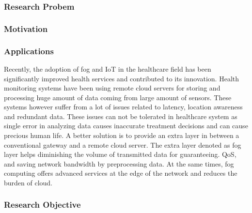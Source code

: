 \documentclass[10pt]{llncs}
\begin{document}
%
\subsubsection{Research Probem}


%
\subsubsection{Motivation}


%

%

%

%
\subsubsection{Applications}
Recently, the adoption of fog and IoT in the healthcare field has been significantly improved health services and contributed to its innovation. Health monitoring systems have been using remote cloud servers for storing and processing huge amount of data coming from large amount of sensors. These systems however suffer from a lot of issues related to latency, location awareness and redundant data. These issues can not be tolerated in healthcare system as single error in analyzing data causes inaccurate treatment decisions and can cause precious human life. A better solution is to provide an extra layer in between a conventional gateway and a remote cloud server. The extra layer denoted as fog layer helps diminishing the volume of transmitted data for guaranteeing. QoS, and saving network bandwidth by preprocessing data. At the same times, fog computing offers advanced services at the edge of the network and reduces the burden of cloud.

%
\subsubsection{Research Objective}



%
\end{document}

